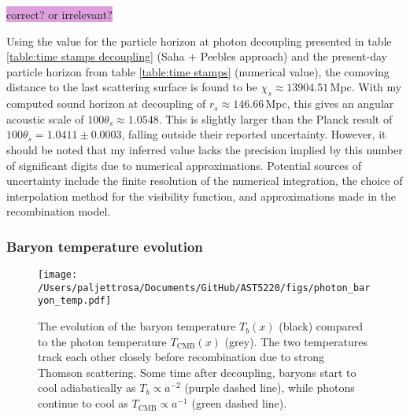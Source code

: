 \documentclass{aa}
\numberwithin{equation}{section}
\numberwithin{table}{section}
\numberwithin{figure}{section}
\begin{document}
\colorbox{Plum}{correct? or irrelevant?}

Using the value for the particle horizon at photon decoupling presented in table \ref{table:time stamps decoupling} (Saha + Peebles approach) and the present-day particle horizon from table \ref{table:time stamps} (numerical value), the comoving distance to the last scattering surface is found to be $\chi_{s} \approx 13904.51\,$Mpc. With my computed sound horizon at decoupling of $r_s \approx 146.66\,$Mpc, this gives an angular acoustic scale of $100\theta_{s} \approx 1.0548$. This is slightly larger than the Planck result of $100\theta_{s} = 1.0411\pm0.0003$, falling outside their reported uncertainty. However, it should be noted that my inferred value lacks the precision implied by this number of significant digits due to numerical approximations. Potential sources of uncertainty include the finite resolution of the numerical integration, the choice of interpolation method for the visibility function, and approximations made in the recombination model.




\subsubsection{Baryon temperature evolution}

\begin{figure}
  \centering
  \texttt{[image: /Users/paljettrosa/Documents/GitHub/AST5220/figs/photon\_baryon\_temp.pdf]}
  \caption{The evolution of the baryon temperature $T_b(x)$ (black) compared to the photon temperature $T_\text{CMB}(x)$ (grey). The two temperatures track each other closely before recombination due to strong Thomson scattering. Some time after decoupling, baryons start to cool adiabatically as $T_b \propto a^{-2}$ (purple dashed line), while photons continue to cool as $T_\text{CMB} \propto a^{-1}$ (green dashed line).}\label{fig:baryon temperature}
\end{figure}
\end{document}
